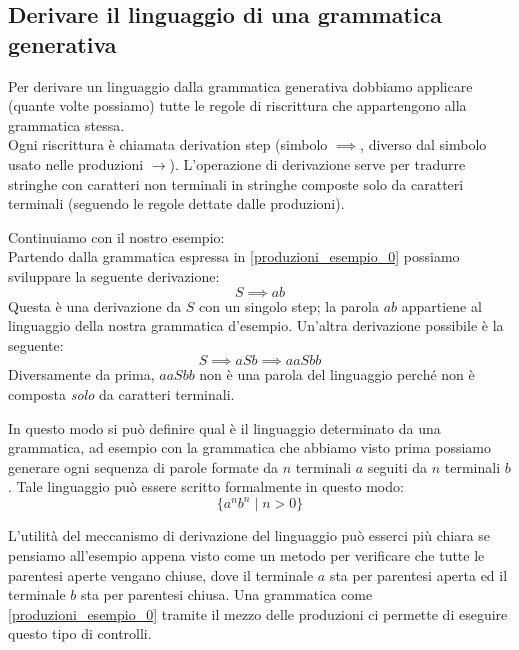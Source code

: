 \documentclass[class=book, crop=false, oneside, 12pt]{standalone}
\begin{document}
\subsection{Derivare il linguaggio di una grammatica generativa}
Per derivare un linguaggio dalla grammatica generativa dobbiamo applicare (quante volte possiamo) tutte le regole di riscrittura che appartengono alla grammatica stessa.\\
Ogni riscrittura è chiamata derivation step (simbolo \(\implies\), diverso dal simbolo usato nelle produzioni \(\to\)).
L’operazione di derivazione serve per tradurre stringhe con caratteri non terminali in stringhe composte solo da caratteri terminali (seguendo le regole dettate dalle produzioni).


Continuiamo con il nostro esempio:\\
Partendo dalla grammatica espressa in \ref{produzioni_esempio_0} possiamo sviluppare la seguente derivazione:
\begin{equation}
    S \implies ab
\end{equation}
Questa è una derivazione da \(S\) con un singolo step; la parola \(ab\) appartiene al linguaggio della nostra grammatica d’esempio.
Un'altra derivazione possibile è la seguente:
\begin{equation}
    S \implies aSb \implies aaSbb
\end{equation}
Diversamente da prima, \(aaSbb\) non è una parola del linguaggio perché non è composta \emph{solo} da caratteri terminali.

In questo modo si può definire qual è il linguaggio determinato da una grammatica, ad esempio con la grammatica che abbiamo visto prima possiamo generare ogni sequenza di parole formate da \(n\) terminali \(a\) seguiti da \(n\) terminali \(b\).
Tale linguaggio può essere scritto formalmente in questo modo:
\begin{equation}
    \{a^n b^n \mid n>0\}
\end{equation}


L'utilità del meccanismo di derivazione del linguaggio può esserci più chiara se pensiamo all'esempio appena visto come un metodo per verificare che tutte le parentesi aperte vengano chiuse, dove il terminale \(a\) sta per parentesi aperta ed il terminale \(b\) sta per parentesi chiusa. Una grammatica come \ref{produzioni_esempio_0} tramite il mezzo delle produzioni ci permette di eseguire questo tipo di controlli.
\end{document}
